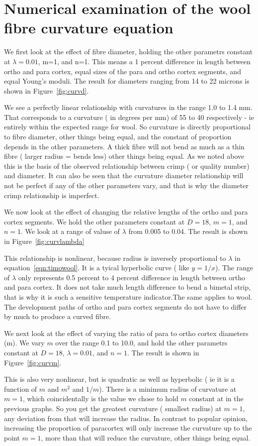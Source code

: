 \documentclass[titlepage]{article}  %
\begin{document}
\section{Numerical examination of the wool fibre curvature equation}
 We first look at the effect of fibre diameter, holding the other parametrs constant at $\lambda = 0.01$, m=1, and n=1. This means a 1 percent difference in length between ortho and para cortex, equal sizes of the para and ortho cortex segments, and equal Young's moduli. The result for diameters ranging from 14 to 22 microns is shown in Figure~\ref{fig:curvd}.

We see a perfectly linear relationship with curvatures in the range 1.0 to 1.4 mm. That corresponds to a curvature ( in degrees per mm) of 55 to 40 respectively - ie entirely within the expected range for wool.
So curvature is directly proportional to fibre diameter, other things being equal, and the constant of proportion depends in the other parameters. A thick fibre will not bend as much as a thin fibre ( larger radius = bends less) other things being equal.
As we noted above this is the basis of the observed relationship between crimp ( or quality number) and diameter. It can also be seen that the curvature diameter relationship will not be perfect if any of the other parameters vary, and that is why the diameter crimp relationship is imperfect.

 We now look at the effect of changing the relative lengths of the ortho and para cortex segments. We hold the other parameters constant at $D=18$, $m=1$, and $n=1$. We look at a range of valuse of $\lambda$ from 0.005 to 0.04. The result is shown in Figure~\ref{fig:curvlambda}

This relationship is nonlinear, because radius is inversely proportional to $\lambda$ in equation~\ref{eqn:timowool}. It is a tyical hyperbolic curve ( like $y=1/x$). The range of $\lambda$ only represents 0.5 percent to 4 percent difference in length between ortho and para cortex. It does not take much length difference to bend a bimetal strip, that is why it is such a sensitive temperature indicator.The same applies to wool. The development paths of ortho and para cortex segments do not have to differ by much to produce a curved fibre. 

We next look at the effect of varying the ratio of para to ortho cortex diameters (m). We vary $m$ over the range 0.1 to 10.0, and hold the other parametrs constant at $D=18$, $\lambda=0.01$, and $n=1$. The result is shown in Figure~\ref{fig:curvm}.

This is also very nonlinear, but is quadratic as well as hyperbolic ( ie it is a function of $m$ and $m^{2}$ and $1/m$). There is a minimum radius of curvature at $m=1$, which coincidentally is the value we chose to hold $m$ constant at in the previous graphs. So you get the greatest curvature ( smallest radius) at $m=1$, any deviation from that will increase the radius. In contrast to popular opinion, increasing the proportion of paracortex will only increase the curvature up to the point $m=1$, more than that will reduce the curvature, other things being equal.
\end{document}
